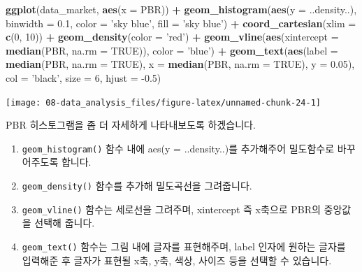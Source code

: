 \documentclass[12pt,]{book}
\newenvironment{Shaded}{\begin{snugshade}}{\end{snugshade}}
\newcommand{\DataTypeTok}[1]{\textcolor[rgb]{0.13,0.29,0.53}{#1}}
\newcommand{\DecValTok}[1]{\textcolor[rgb]{0.00,0.00,0.81}{#1}}
\newcommand{\FloatTok}[1]{\textcolor[rgb]{0.00,0.00,0.81}{#1}}
\newcommand{\KeywordTok}[1]{\textcolor[rgb]{0.13,0.29,0.53}{\textbf{#1}}}
\newcommand{\NormalTok}[1]{#1}
\newcommand{\OperatorTok}[1]{\textcolor[rgb]{0.81,0.36,0.00}{\textbf{#1}}}
\newcommand{\OtherTok}[1]{\textcolor[rgb]{0.56,0.35,0.01}{#1}}
\newcommand{\StringTok}[1]{\textcolor[rgb]{0.31,0.60,0.02}{#1}}
\providecommand{\tightlist}{%
  \setlength{\itemsep}{0pt}\setlength{\parskip}{0pt}}
\begin{document}
\begin{Shaded}
\begin{Highlighting}[]
\KeywordTok{ggplot}\NormalTok{(data_market, }\KeywordTok{aes}\NormalTok{(}\DataTypeTok{x =}\NormalTok{ PBR)) }\OperatorTok{+}
\StringTok{  }\KeywordTok{geom_histogram}\NormalTok{(}\KeywordTok{aes}\NormalTok{(}\DataTypeTok{y =}\NormalTok{ ..density..),}
                 \DataTypeTok{binwidth =} \FloatTok{0.1}\NormalTok{,}
                 \DataTypeTok{color =} \StringTok{'sky blue'}\NormalTok{, }\DataTypeTok{fill =} \StringTok{'sky blue'}\NormalTok{) }\OperatorTok{+}\StringTok{ }
\StringTok{  }\KeywordTok{coord_cartesian}\NormalTok{(}\DataTypeTok{xlim =} \KeywordTok{c}\NormalTok{(}\DecValTok{0}\NormalTok{, }\DecValTok{10}\NormalTok{)) }\OperatorTok{+}
\StringTok{  }\KeywordTok{geom_density}\NormalTok{(}\DataTypeTok{color =} \StringTok{'red'}\NormalTok{) }\OperatorTok{+}
\StringTok{  }\KeywordTok{geom_vline}\NormalTok{(}\KeywordTok{aes}\NormalTok{(}\DataTypeTok{xintercept =} \KeywordTok{median}\NormalTok{(PBR, }\DataTypeTok{na.rm =} \OtherTok{TRUE}\NormalTok{)),}
             \DataTypeTok{color =} \StringTok{'blue'}\NormalTok{) }\OperatorTok{+}
\StringTok{  }\KeywordTok{geom_text}\NormalTok{(}\KeywordTok{aes}\NormalTok{(}\DataTypeTok{label =} \KeywordTok{median}\NormalTok{(PBR, }\DataTypeTok{na.rm =} \OtherTok{TRUE}\NormalTok{),}
                \DataTypeTok{x =} \KeywordTok{median}\NormalTok{(PBR, }\DataTypeTok{na.rm =} \OtherTok{TRUE}\NormalTok{), }\DataTypeTok{y =} \FloatTok{0.05}\NormalTok{),}
             \DataTypeTok{col =} \StringTok{'black'}\NormalTok{, }\DataTypeTok{size =} \DecValTok{6}\NormalTok{, }\DataTypeTok{hjust =} \FloatTok{-0.5}\NormalTok{)}
\end{Highlighting}
\end{Shaded}

\begin{center}\texttt{[image: 08-data\_analysis\_files/figure-latex/unnamed-chunk-24-1]} \end{center}

PBR 히스토그램을 좀 더 자세하게 나타내보도록 하겠습니다.

\begin{enumerate}
\def\labelenumi{\arabic{enumi}.}
\tightlist
\item
  \texttt{geom\_histogram()} 함수 내에 aes(y = ..density..)를 추가해주어 밀도함수로 바꾸어주도록 합니다.
\item
  \texttt{geom\_density()} 함수를 추가해 밀도곡선을 그려줍니다.
\item
  \texttt{geom\_vline()} 함수는 세로선을 그려주며, xintercept 즉 x축으로 PBR의 중앙값을 선택해 줍니다.
\item
  \texttt{geom\_text()} 함수는 그림 내에 글자를 표현해주며, label 인자에 원하는 글자를 입력해준 후 글자가 표현될 x축, y축, 색상, 사이즈 등을 선택할 수 있습니다.
\end{enumerate}
\end{document}
